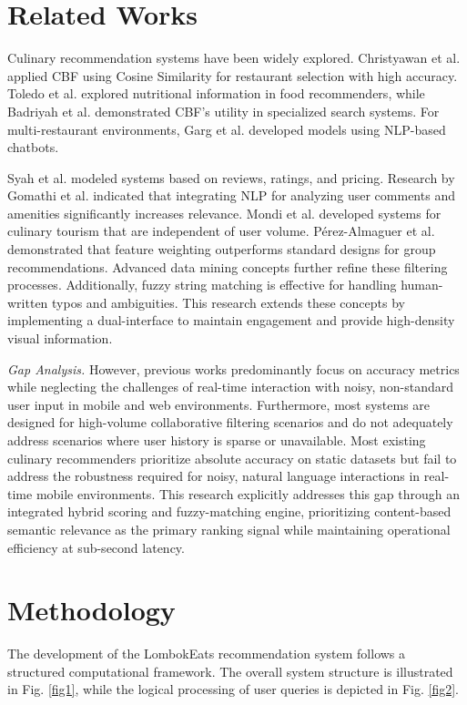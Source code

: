 \documentclass[conference]{IEEEtran}
\begin{document}
\section{Related Works}
Culinary recommendation systems have been widely explored. Christyawan et al. applied CBF using Cosine Similarity for restaurant selection with high accuracy\cite{b1,b3}. Toledo et al. explored nutritional information in food recommenders\cite{b2,b3}, while Badriyah et al. demonstrated CBF's utility in specialized search systems\cite{b3}. For multi-restaurant environments, Garg et al. developed models using NLP-based chatbots\cite{b4}.

Syah et al. modeled systems based on reviews, ratings, and pricing\cite{b5}. Research by Gomathi et al. indicated that integrating NLP for analyzing user comments and amenities significantly increases relevance\cite{b8}. Mondi et al. developed systems for culinary tourism that are independent of user volume\cite{b9}. Pérez-Almaguer et al. demonstrated that feature weighting outperforms standard designs for group recommendations\cite{b10}. Advanced data mining concepts further refine these filtering processes\cite{b11}. Additionally, fuzzy string matching is effective for handling human-written typos and ambiguities\cite{b13}. This research extends these concepts by implementing a dual-interface to maintain engagement and provide high-density visual information\cite{b3}.

\textit{Gap Analysis.} However, previous works predominantly focus on accuracy metrics while neglecting the challenges of real-time interaction with noisy, non-standard user input in mobile and web environments. Furthermore, most systems are designed for high-volume collaborative filtering scenarios and do not adequately address scenarios where user history is sparse or unavailable. Most existing culinary recommenders prioritize absolute accuracy on static datasets but fail to address the robustness required for noisy, natural language interactions in real-time mobile environments. This research explicitly addresses this gap through an integrated hybrid scoring and fuzzy-matching engine, prioritizing content-based semantic relevance as the primary ranking signal while maintaining operational efficiency at sub-second latency.

\section{Methodology}
The development of the LombokEats recommendation system follows a structured computational framework. The overall system structure is illustrated in Fig. \ref{fig1}, while the logical processing of user queries is depicted in Fig. \ref{fig2}\cite{b16}.
\end{document}
